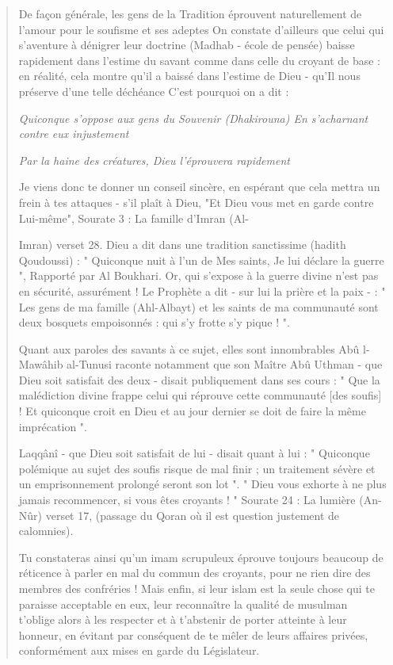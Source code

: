 \begin{quote}
De façon générale, les gens de la Tradition éprouvent naturellement de
l'amour pour le soufisme et ses adeptes On constate d'ailleurs que celui
qui s'aventure à dénigrer leur doctrine (Madhab - école de pensée)
baisse rapidement dans l'estime du savant comme dans celle du croyant de
base : en réalité, cela montre qu'il a baissé dans l'estime de Dieu -
qu'Il nous préserve d'une telle déchéance C'est pourquoi on a dit :

\emph{Quiconque s'oppose aux gens du Souvenir (Dhakirouna) En
s'acharnant contre eux injustement}

\emph{Par la haine des créatures, Dieu l'éprouvera rapidement}

Je viens donc te donner un conseil sincère, en espérant que cela mettra
un frein à tes attaques - s'il plaît à Dieu, "Et Dieu vous met en garde
contre Lui-même", Sourate 3 : La famille d'Imran (Al-

Imran) verset 28. Dieu a dit dans une tradition sanctissime (hadith
Qoudoussi) : " Quiconque nuit à l'un de Mes saints, Je lui déclare la
guerre ", Rapporté par Al Boukhari. Or, qui s'expose à la guerre divine
n'est pas en sécurité, assurément ! Le Prophète a dit - sur lui la
prière et la paix - : " Les gens de ma famille (Ahl-Albayt) et les
saints de ma communauté sont deux bosquets empoisonnés : qui s'y frotte
s'y pique ! ".

Quant aux paroles des savants à ce sujet, elles sont innombrables Abû
l-Mawâhib al-Tunusi raconte notamment que son Maître Abû Uthman - que
Dieu soit satisfait des deux - disait publiquement dans ses cours : "
Que la malédiction divine frappe celui qui réprouve cette communauté
{[}des soufis{]} ! Et quiconque croit en Dieu et au jour dernier se doit
de faire la même imprécation ".

Laqqânî - que Dieu soit satisfait de lui - disait quant à lui : "
Quiconque polémique au sujet des soufis risque de mal finir ; un
traitement sévère et un emprisonnement prolongé seront son lot ". " Dieu
vous exhorte à ne plus jamais recommencer, si vous êtes croyants ! "
Sourate 24 : La lumière (An-Nûr) verset 17, (passage du Qoran où il est
question justement de calomnies).

Tu constateras ainsi qu'un imam scrupuleux éprouve toujours beaucoup de
réticence à parler en mal du commun des croyants, pour ne rien dire des
membres des confréries ! Mais enfin, si leur islam est la seule chose
qui te paraisse acceptable en eux, leur reconnaître la qualité de
musulman t'oblige alors à les respecter et à t'abstenir de porter
atteinte à leur honneur, en évitant par conséquent de te mêler de leurs
affaires privées, conformément aux mises en garde du Législateur.


\end{quote}
